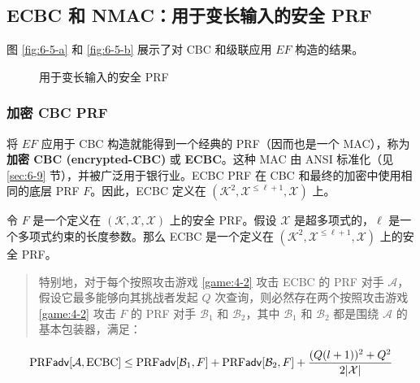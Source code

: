 \subsection{ECBC 和 NMAC：用于变长输入的安全 PRF}

图 \ref{fig:6-5-a} 和 \ref{fig:6-5-b} 展示了对 CBC 和级联应用 $EF$ 构造的结果。

\begin{figure}
  \centering
  
  \caption{用于变长输入的安全 PRF}
\end{figure}

\subsubsection{加密 CBC PRF}

将 $EF$ 应用于 CBC 构造就能得到一个经典的 PRF（因而也是一个 MAC），称为\textbf{加密 CBC (encrypted-CBC)} 或 \textbf{ECBC}。这种 MAC 由 ANSI 标准化（见 \ref{sec:6-9} 节），并被广泛用于银行业。ECBC PRF 在 CBC 和最终的加密中使用相同的底层 PRF $F$。因此，ECBC 定义在 $(\mathcal{K}^2,\mathcal{X}^{\leq\ell+1},\mathcal{X})$ 上。

\begin{theorem}
令 $F$ 是一个定义在 $(\mathcal{K},\mathcal{X},\mathcal{X})$ 上的安全 PRF。假设 $\mathcal{X}$ 是超多项式的，$\ell$ 是一个多项式约束的长度参数。那么 ECBC 是一个定义在 $(\mathcal{K}^2,\mathcal{X}^{\leq\ell+1},\mathcal{X})$ 上的安全 PRF。
\begin{quote}
特别地，对于每个按照攻击游戏 \ref{game:4-2} 攻击 ECBC 的 PRF 对手 $\mathcal{A}$，假设它最多能够向其挑战者发起 $Q$ 次查询，则必然存在两个按照攻击游戏 \ref{game:4-2} 攻击 $F$ 的 PRF 对手 $\mathcal{B}_1$ 和 $\mathcal{B}_2$，其中 $\mathcal{B}_1$ 和 $\mathcal{B}_2$ 都是围绕 $\mathcal{A}$ 的基本包装器，满足：
\end{quote}
\begin{equation}\label{eq:6-19}
{\rm PRF}\mathsf{adv}[\mathcal{A},{\rm ECBC}]\leq{\rm PRF}\mathsf{adv}[\mathcal{B}_1,F]+{\rm PRF}\mathsf{adv}[\mathcal{B}_2,F]+\frac{(Q(l+1))^2+Q^2}{2|\mathcal{X}|}
\end{equation}
\end{theorem}

